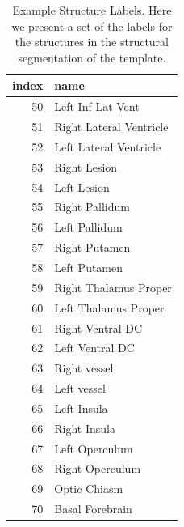 \documentclass[
]{article}
\begin{document}
\begin{table}

\caption{\label{tab:labs}Example Structure Labels.  Here we present a set of the labels for the structures in the structural segmentation of the template.}
\centering
\begin{tabular}[t]{r|l}
\hline
index & name\\
\hline
50 & Left Inf Lat Vent\\
\hline
51 & Right Lateral Ventricle\\
\hline
52 & Left Lateral Ventricle\\
\hline
53 & Right Lesion\\
\hline
54 & Left Lesion\\
\hline
55 & Right Pallidum\\
\hline
56 & Left Pallidum\\
\hline
57 & Right Putamen\\
\hline
58 & Left Putamen\\
\hline
59 & Right Thalamus Proper\\
\hline
60 & Left Thalamus Proper\\
\hline
61 & Right Ventral DC\\
\hline
62 & Left Ventral DC\\
\hline
63 & Right vessel\\
\hline
64 & Left vessel\\
\hline
65 & Left Insula\\
\hline
66 & Right Insula\\
\hline
67 & Left Operculum\\
\hline
68 & Right Operculum\\
\hline
69 & Optic Chiasm\\
\hline
70 & Basal Forebrain\\
\hline
\end{tabular}
\end{table}
\end{document}
